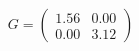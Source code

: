 \documentclass[preview]{standalone}
\begin{document}
\begin{align*}
G = \begin{pmatrix} 1.56 & 0.00 \\ 0.00 & 3.12 \end{pmatrix}
\end{align*}
\end{document}
